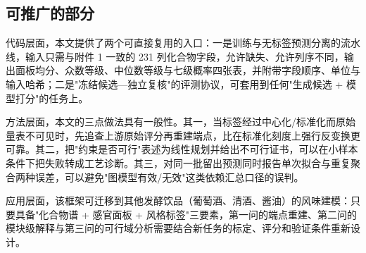 \subsection{可推广的部分}

代码层面，本文提供了两个可直接复用的入口：一是训练与无标签预测分离的流水线，输入只需与附件 1 一致的 231 列化合物字段，允许缺失、允许列序不同，输出面板均分、众数等级、中位数等级与七级概率四张表，并附带字段顺序、单位与输入哈希；二是"冻结候选—独立复核"的评测协议，可套用到任何"生成候选 + 模型打分"的任务上。

方法层面，本文的三点做法具有一般性。其一，当标签经过中心化/标准化而原始量表不可见时，先追查上游原始评分再重建端点，比在标准化刻度上强行反变换更可靠。其二，把"约束是否可行"表述为线性规划并给出不可行证书，可以在小样本条件下把失败转成工艺诊断。其三，对同一批留出预测同时报告单次拟合与重复聚合两种误差，可以避免"图模型有效/无效"这类依赖汇总口径的误判。

应用层面，该框架可迁移到其他发酵饮品（葡萄酒、清酒、酱油）的风味建模：只要具备"化合物谱 + 感官面板 + 风格标签"三要素，第一问的端点重建、第二问的模块级解释与第三问的可行域分析需要结合新任务的标定、评分和验证条件重新设计。
